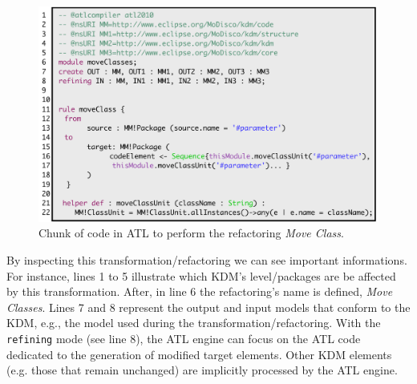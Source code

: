 
\begin{figure}[h]
	\centering
	\includegraphics[scale=0.47]{figuras/ATLTRansformationLanguage}
	\caption{Chunk of code in ATL to perform the refactoring \textit{Move Class}.}
	\label{fig:ATLRefactoring}
\end{figure}


By inspecting this transformation/refactoring we can see important informations. For instance, lines 1 to 5 illustrate which KDM's level/packages are be affected by this transformation.  After, in line 6 the refactoring's name is defined, \textit{Move Classes}. Lines 7 and 8 represent the output and input models that conform to the KDM, e.g., the model used during the transformation/refactoring. 
%
With the \texttt{refining} mode (see line 8), the ATL engine can focus on the ATL code dedicated to the generation of modified target elements. Other KDM elements (e.g. those that remain unchanged) are implicitly processed by the ATL engine.

